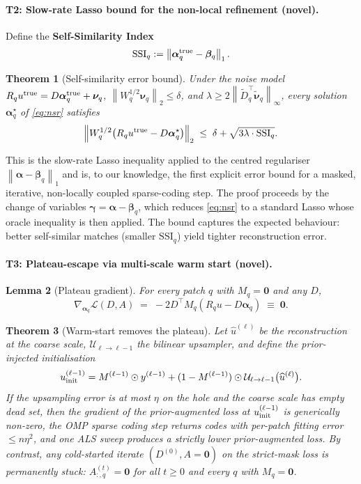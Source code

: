 \documentclass[11pt,a4paper]{article}
\newtheorem{theorem}{Theorem}
\newtheorem{lemma}[theorem]{Lemma}
\theoremstyle{definition}
\theoremstyle{remark}
\newcommand{\Loss}{\mathcal{L}}
\newcommand{\norm}[1]{\left\lVert #1 \right\rVert}
\newcommand{\alphavec}{\bm{\alpha}}
\begin{document}
\paragraph{T2: Slow-rate Lasso bound for the non-local refinement
(novel).}
Define the \textbf{Self-Similarity Index}
\[
\mathrm{SSI}_q := \norm{\alphavec_q^{\rm true}-\bm{\beta}_q}_1.
\]

\begin{theorem}[Self-similarity error bound]
\label{thm:lasso}
Under the noise model $R_q u^{\rm true} = D\alphavec_q^{\rm true}+\bm{\nu}_q$,
$\norm{W_q^{1/2}\bm{\nu}_q}_2\le\delta$, and $\lambda\ge
2\norm{\widetilde D_q^\top \widetilde{\bm{\nu}}_q}_\infty$, every
solution $\alphavec_q^\star$ of \eqref{eq:nsr} satisfies
\[
\norm{W_q^{1/2}\bigl(R_q u^{\rm true}-D\alphavec_q^\star\bigr)}_2
\;\le\;\delta+\sqrt{3\lambda\cdot\mathrm{SSI}_q}.
\]
\end{theorem}

This is the slow-rate Lasso inequality applied to the centred
regulariser $\norm{\alphavec-\bm{\beta}_q}_1$ and is, to our
knowledge, the first explicit error bound for a masked, iterative,
non-locally coupled sparse-coding step. The proof proceeds by the
change of variables $\bm{\gamma}=\alphavec-\bm{\beta}_q$, which
reduces \eqref{eq:nsr} to a standard Lasso whose oracle inequality is
then applied. The bound captures the expected behaviour: better
self-similar matches (smaller $\mathrm{SSI}_q$) yield tighter
reconstruction error.

\paragraph{T3: Plateau-escape via multi-scale warm start (novel).}

\begin{lemma}[Plateau gradient]
\label{lem:plateau}
For every patch $q$ with $M_q=\bm{0}$ and any $D$,
\[
\nabla_{\alphavec_q}\Loss(D,A)
\;=\;-2D^\top M_q(R_q u-D\alphavec_q)\;\equiv\;\bm{0}.
\]
\end{lemma}

\begin{theorem}[Warm-start removes the plateau]
\label{thm:warm}
Let $\widehat u^{(\ell)}$ be the reconstruction at the coarse scale,
$\mathcal{U}_{\ell\to\ell-1}$ the bilinear upsampler, and define the
prior-injected initialisation
\[
u^{(\ell-1)}_{\rm init}
=M^{(\ell-1)}\odot y^{(\ell-1)}+(1-M^{(\ell-1)})\odot \mathcal{U}_{\ell\to\ell-1}\bigl(\widehat u^{(\ell)}\bigr).
\]
If the upsampling error is at most $\eta$ on the hole and the coarse
scale has empty dead set, then the gradient of the prior-augmented
loss at $u^{(\ell-1)}_{\rm init}$ is generically non-zero, the OMP
sparse coding step returns codes with per-patch fitting error
$\le n\eta^2$, and one ALS sweep produces a strictly lower
prior-augmented loss. By contrast, any cold-started iterate
$(D^{(0)},A=\bm{0})$ on the strict-mask loss is permanently stuck:
$A^{(t)}_{:,q}=\bm{0}$ for all $t\ge 0$ and every $q$ with $M_q=\bm{0}$.
\end{theorem}
\end{document}
